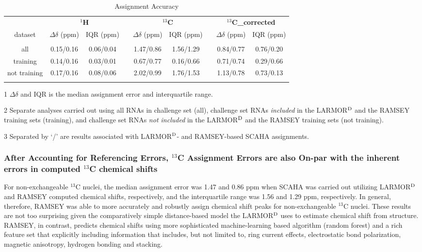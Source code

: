 \documentclass[journal=jcisd8,manuscript=article,layout=onecolumn]{achemso}
\begin{document}
\begin{table}[h!]
\centering
\caption{Assignment Accuracy}
\begin{threeparttable}
\begin{tabular}{c c c c c c c c c}
\toprule
{} &  \multicolumn{2}{c}{\textbf{$^{1}$H}} & {} & \multicolumn{2}{c}{\textbf{$^{13}$C}} & {} & \multicolumn{2}{c}{\textbf{$^{13}$C_{\rm corrected}}} \\   
dataset & $\Delta \delta$ (ppm) & IQR (ppm)  & {} & $\Delta \delta$ (ppm) & IQR (ppm) & {} & $\Delta \delta$ (ppm) & IQR (ppm)   \\
\hline
\\
all & 0.15/0.16 & 0.06/0.04 & {} & 1.47/0.86 & 1.56/1.29 & {} & 0.84/0.77 & 0.76/0.20 \\
training & 0.14/0.16 & 0.03/0.01 & {} & 0.67/0.77 & 0.16/0.66 & {} & 0.71/0.74 & 0.29/0.66 \\
not training & 0.17/0.16 & 0.08/0.06 & {} & 2.02/0.99 & 1.76/1.53 & {} & 1.13/0.78 & 0.73/0.13 \\
\\
\hline
\end{tabular}
\begin{tablenotes}
\item[1] $\Delta\delta$ and IQR is the median assignment error and interquartile range.
\item[2] Separate analyses carried out using all RNAs in challenge set (all), challenge set RNAs \textit{included} in the LARMOR$^{\rm D}$ and the RAMSEY training sets (training), and challenge set RNAs \textit{not included} in the LARMOR$^{\rm D}$ and the RAMSEY training sets (not training).
\item[3] Separated by `/' are  results associated with LARMOR$^{\rm D}$- and RAMSEY-based SCAHA assignments.

\end{tablenotes}
\end{threeparttable}
\label{tab:accuracy} 
\end{table}
\subsubsection{After Accounting for Referencing Errors, $^{13}$C Assignment Errors are also On-par with the inherent errors in computed $^{13}$C chemical shifts} 
For non-exchangeable $^{13}$C nuclei, the median assignment error was 1.47 and 0.86 ppm when SCAHA was carried out utilizing LARMOR$^{\rm D}$ and RAMSEY computed chemical shifts, respectively, and the interquartile range was 1.56 and 1.29 ppm, respectively. In general, therefore, RAMSEY was able to more accurately and robustly assign chemical shift peaks for  non-exchangeable $^{13}$C nuclei. These results are not too surprising given the comparatively simple distance-based model the LARMOR$^{\rm D}$ uses to estimate chemical shift from structure. RAMSEY, in contrast, predicts chemical shifts using more sophisticated machine-learning based algorithm (random forest) and a rich feature set that explicitly including information that includes, but not limited to, ring current effects, electrostatic bond polarization, magnetic anisotropy, hydrogen bonding and stacking. 
\end{document}
